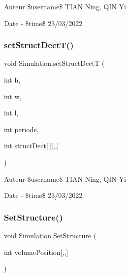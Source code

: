\begin{DoxyAuthor}{Auteur}
\$username\$ T\+I\+AN Ning, Q\+IN Yi 
\end{DoxyAuthor}
\begin{DoxyDate}{Date}
-\/ \$time\$ 23/03/2022 
\end{DoxyDate}
\mbox{\label{class_simulation_a19b96b4354d41349e367d282cc4e88aa}} 
\subsubsection{\texorpdfstring{set\+Struct\+Dect\+T()}{setStructDectT()}}
{\footnotesize\ttfamily void Simulation.\+set\+Struct\+DectT (\begin{DoxyParamCaption}\item[{int}]{h,  }\item[{int}]{w,  }\item[{int}]{l,  }\item[{int}]{periode,  }\item[{int}]{struct\+Dect\mbox{[}$\,$\mbox{]}\mbox{[},,\mbox{]} }\end{DoxyParamCaption})\hspace{0.3cm}{\ttfamily [inline]}}

\begin{DoxyAuthor}{Auteur}
\$username\$ T\+I\+AN Ning, Q\+IN Yi 
\end{DoxyAuthor}
\begin{DoxyDate}{Date}
-\/ \$time\$ 23/03/2022 
\end{DoxyDate}
\mbox{\label{class_simulation_a775498931843884fbc6c08de3b2b1afd}} 
\subsubsection{\texorpdfstring{Set\+Structure()}{SetStructure()}}
{\footnotesize\ttfamily void Simulation.\+Set\+Structure (\begin{DoxyParamCaption}\item[{int}]{volume\+Position\mbox{[},,\mbox{]} }\end{DoxyParamCaption})\hspace{0.3cm}{\ttfamily [inline]}}



